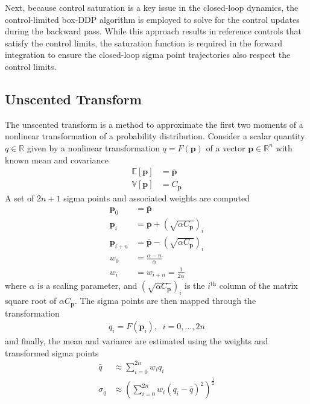 \documentclass[journal ]{new-aiaa}
\newcommand{\param}{\ensuremath{\mathbf{p}}}
\newcommand{\E}[1]{\mathbb{E}\left[#1\right]}
\newcommand{\V}[1]{\mathbb{V}[#1]}
\newcommand{\cov}{C}
\begin{document}
Next, because control saturation is a key issue in the closed-loop dynamics, the control-limited box-DDP algorithm \cite{DDP_ControlLimited} is employed to solve for the control updates during the backward pass. While this approach results in reference controls that satisfy the control limits, the saturation function is required in the forward integration to ensure the closed-loop sigma point trajectories also respect the control limits.

\subsection*{Unscented Transform}
The unscented transform is a method to approximate the first two moments of a nonlinear transformation of a probability distribution. Consider a scalar quantity $q\in\mathbb{R}$ given by a nonlinear transformation $q = F(\param)$ of a vector $\param\in\mathbb{R}^n$ with known mean and covariance
\begin{align*}
\E{\param} &= \bar{\param}\\
\V{\param} &= \cov_{\param}
\end{align*}
A set of $2n+1$ sigma points and associated weights are computed 
\begin{align*}
\param_0 &= \bar{\param} \\
\param_i &=  \bar{\param} + \left(\sqrt{\alpha \cov_{\param}}\right)_i \\
\param_{i+n} &=  \bar{\param} - \left(\sqrt{\alpha\cov_{\param}}\right)_i \\
w_0 &= \frac{\alpha - n}{\alpha} \\
w_i &= w_{i+n} = \frac{1}{2\alpha}
\end{align*}
where $\alpha$ is a scaling parameter, and $\left(\sqrt{\alpha \cov_{\param}}\right)_i$ is the $i^{\mathrm{th}}$ column of the matrix square root of $\alpha \cov_{\param}$. The sigma points are then mapped through the transformation
\begin{align}
q_i = F(\param_i),\;\;i=0,...,2n
\end{align}
and finally, the mean and variance are estimated using the weights and transformed sigma points
\begin{align*}
\bar{q} &\approx \sum_{i=0}^{2n}w_iq_i\\
\sigma_{q} &\approx \left(\sum_{i=0}^{2n}w_i\left(q_i - \bar{q}\right)^2\right)^{\frac{1}{2}}
\end{align*}
\end{document}
